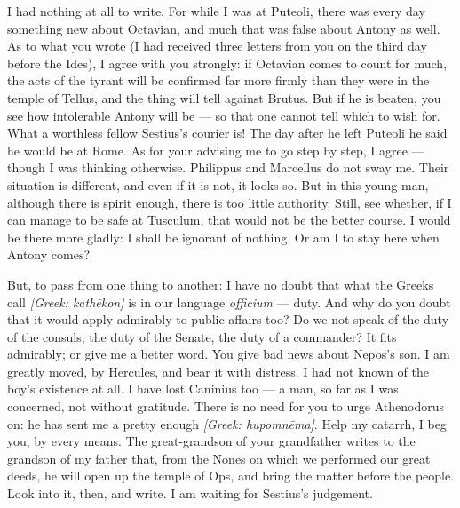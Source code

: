 

 I had nothing at all to write. For while I was at Puteoli, there was every day something new about Octavian, and much that was false about Antony as well. As to what you wrote (I had received three letters from you on the third day before the Ides), I agree with you strongly: if Octavian comes to count for much, the acts of the tyrant will be confirmed far more firmly than they were in the temple of Tellus, and the thing will tell against Brutus. But if he is beaten, you see how intolerable Antony will be --- so that one cannot tell which to wish for. What a worthless fellow Sestius's courier is! The day after he left Puteoli he said he would be at Rome. As for your advising me to go step by step, I agree --- though I was thinking otherwise. Philippus and Marcellus do not sway me. Their situation is different, and even if it is not, it looks so. But in this young man, although there is spirit enough, there is too little authority. Still, see whether, if I can manage to be safe at Tusculum, that would not be the better course. I would be there more gladly: I shall be ignorant of nothing. Or am I to stay here when Antony comes?

 But, to pass from one thing to another: I have no doubt that what the Greeks call \textit{[Greek: kathēkon]} is in our language \textit{officium} --- duty. And why do you doubt that it would apply admirably to public affairs too? Do we not speak of the duty of the consuls, the duty of the Senate, the duty of a commander? It fits admirably; or give me a better word. You give bad news about Nepos's son. I am greatly moved, by Hercules, and bear it with distress. I had not known of the boy's existence at all. I have lost Caninius too --- a man, so far as I was concerned, not without gratitude. There is no need for you to urge Athenodorus on: he has sent me a pretty enough \textit{[Greek: hupomnēma]}. Help my catarrh, I beg you, by every means. The great-grandson of your grandfather writes to the grandson of my father that, from the Nones on which we performed our great deeds, he will open up the temple of Ops, and bring the matter before the people. Look into it, then, and write. I am waiting for Sestius's judgement.
